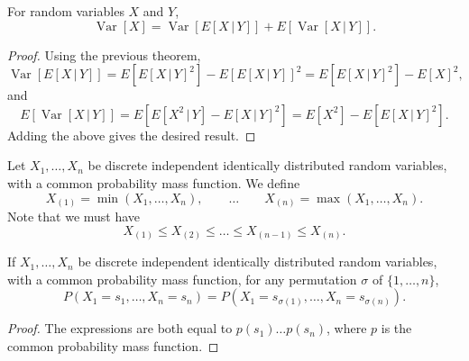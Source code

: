 \documentclass[11pt]{article}
\newcommand\E[1]{E\left[#1\right]}
\newcommand\var[1]{\operatorname{Var}[#1]}
\theoremstyle{definition}
\theoremstyle{remark}
\numberwithin{equation}{module}
\begin{document}
    \begin{theorem}
        For random variables $X$ and $Y$, \[
            \var{X} = \var{\E{X\,|\,Y}} + \E{\var{X\,|\,Y}}.
        \] 
    \end{theorem}
    \begin{proof}
        Using the previous theorem, \[
            \var{\E{X\,|\,Y}} = \E{\E{X\,|\,Y}^2} - \E{\E{X\,|\,Y}}^2 =
            \E{\E{X\,|\,Y}^2} - \E{X}^2,
        \] and \[
            \E{\var{X\,|\,Y}} = \E{\E{X^2\,|\,Y} - \E{X\,|\,Y}^2} =
            \E{X^2} - \E{\E{X\,|\,Y}^2}.
        \] Adding the above gives the desired result.
    \end{proof}

    \begin{definition}
        Let $X_1, \dots, X_n$ be discrete independent identically distributed random
        variables, with a common probability mass function. We define \[
            X_{(1)} = \min(X_1, \dots, X_n), \qquad \dots \qquad X_{(n)} =
            \max(X_1, \dots, X_n).
        \] Note that we must have \[
            X_{(1)} \leq X_{(2)} \leq \dots \leq X_{(n - 1)} \leq X_{(n)}.
        \]
    \end{definition}
    \begin{lemma}
        If $X_1, \dots, X_n$ be discrete independent identically distributed random
        variables, with a common probability mass function, for any permutation
        $\sigma$ of $\{1, \dots, n\}$, \[
            P(X_1 = s_1, \dots, X_n = s_n) = P(X_1 = s_{\sigma(1)}, \dots, X_n =
            s_{\sigma(n)}).
        \] 
    \end{lemma}
    \begin{proof}
        The expressions are both equal to $p(s_1) \dots p(s_n)$, where $p$ is the
        common probability mass function.
    \end{proof}
\end{document}
